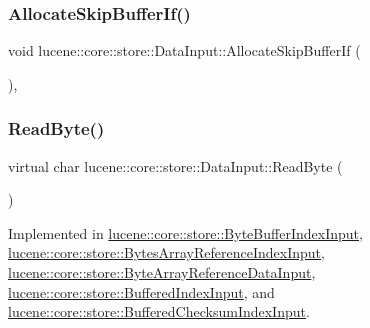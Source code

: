 \subsubsection{\texorpdfstring{Allocate\+Skip\+Buffer\+If()}{AllocateSkipBufferIf()}}
{\footnotesize\ttfamily void lucene\+::core\+::store\+::\+Data\+Input\+::\+Allocate\+Skip\+Buffer\+If (\begin{DoxyParamCaption}{ }\end{DoxyParamCaption})\hspace{0.3cm}{\ttfamily [inline]}, {\ttfamily [private]}}

\mbox{\label{classlucene_1_1core_1_1store_1_1DataInput_a60f2550ccbe4decde30f3773dc53c0ef}} 
\subsubsection{\texorpdfstring{Read\+Byte()}{ReadByte()}}
{\footnotesize\ttfamily virtual char lucene\+::core\+::store\+::\+Data\+Input\+::\+Read\+Byte (\begin{DoxyParamCaption}{ }\end{DoxyParamCaption})\hspace{0.3cm}{\ttfamily [pure virtual]}}



Implemented in \mbox{\hyperlink{classlucene_1_1core_1_1store_1_1ByteBufferIndexInput_a0bad8b8c3af381ba0705f1b00fa56aee}{lucene\+::core\+::store\+::\+Byte\+Buffer\+Index\+Input}}, \mbox{\hyperlink{classlucene_1_1core_1_1store_1_1BytesArrayReferenceIndexInput_a4441afb049c518c35987a22c01b1e4e0}{lucene\+::core\+::store\+::\+Bytes\+Array\+Reference\+Index\+Input}}, \mbox{\hyperlink{classlucene_1_1core_1_1store_1_1ByteArrayReferenceDataInput_a2e711c547ea22188302c7417509e7cca}{lucene\+::core\+::store\+::\+Byte\+Array\+Reference\+Data\+Input}}, \mbox{\hyperlink{classlucene_1_1core_1_1store_1_1BufferedIndexInput_a6e3f97c5f13987f4e8cf31dfe4b31060}{lucene\+::core\+::store\+::\+Buffered\+Index\+Input}}, and \mbox{\hyperlink{classlucene_1_1core_1_1store_1_1BufferedChecksumIndexInput_acbb041afa162556f78073457a4e790f3}{lucene\+::core\+::store\+::\+Buffered\+Checksum\+Index\+Input}}.

\mbox{\label{classlucene_1_1core_1_1store_1_1DataInput_aa5f24102b9b50a190bcb7a8edb82ea2d}} 
